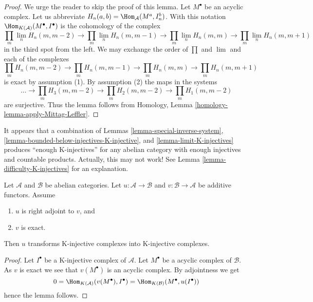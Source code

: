 \begin{proof}
We urge the reader to skip the proof of this lemma.
Let $M^\bullet$ be an acyclic complex. Let us abbreviate
$H_n(a, b) = \Hom_\mathcal{A}(M^a, I_n^b)$. With this notation
$\Hom_{K(\mathcal{A})}(M^\bullet, I^\bullet)$ is the cohomology
of the complex
$$
\prod_m \lim\limits_n H_n(m, m - 2)
\to
\prod_m \lim\limits_n H_n(m, m - 1)
\to
\prod_m \lim\limits_n H_n(m, m)
\to
\prod_m \lim\limits_n H_n(m, m + 1)
$$
in the third spot from the left.
We may exchange the order of $\prod$ and $\lim$ and each of the complexes
$$
\prod_m H_n(m, m - 2)
\to
\prod_m H_n(m, m - 1)
\to
\prod_m H_n(m, m)
\to
\prod_m H_n(m, m + 1)
$$
is exact by assumption (1). By assumption (2) the maps in the systems
$$
\ldots \to
\prod_m H_3(m, m - 2) \to
\prod_m H_2(m, m - 2) \to
\prod_m H_1(m, m - 2)
$$
are surjective. Thus the lemma follows from
Homology, Lemma \ref{homology-lemma-apply-Mittag-Leffler}.
\end{proof}

\noindent
It appears that a combination of Lemmas \ref{lemma-special-inverse-system},
\ref{lemma-bounded-below-injectives-K-injective}, and
\ref{lemma-limit-K-injectives} produces ``enough K-injectives'' for any
abelian category with enough injectives and countable products.
Actually, this may not work! See Lemma \ref{lemma-difficulty-K-injectives}
for an explanation.

\begin{lemma}
\label{lemma-adjoint-preserve-K-injectives}
Let $\mathcal{A}$ and $\mathcal{B}$ be abelian categories.
Let $u : \mathcal{A} \to \mathcal{B}$ and
$v : \mathcal{B} \to \mathcal{A}$ be additive functors. Assume
\begin{enumerate}
\item $u$ is right adjoint to $v$, and
\item $v$ is exact.
\end{enumerate}
Then $u$ transforms K-injective complexes into K-injective complexes.
\end{lemma}

\begin{proof}
Let $I^\bullet$ be a K-injective complex of $\mathcal{A}$.
Let $M^\bullet$ be a acyclic complex of $\mathcal{B}$.
As $v$ is exact we see that $v(M^\bullet)$ is an acyclic complex.
By adjointness we get
$$
0 = \Hom_{K(\mathcal{A})}(v(M^\bullet), I^\bullet) =
\Hom_{K(\mathcal{B})}(M^\bullet, u(I^\bullet))
$$
hence the lemma follows.
\end{proof}





